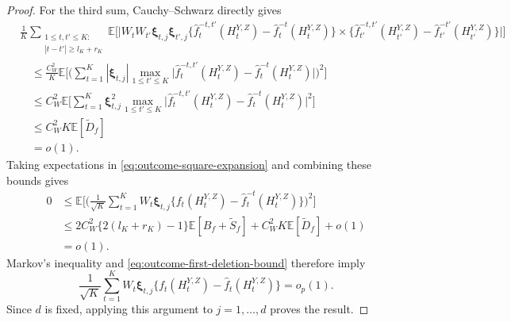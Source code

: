 \documentclass[10pt,a4paper]{amsart}
\def\E{\mathbb{E}}
\begin{document}
\begin{proof}
For the third sum, Cauchy--Schwarz directly gives
\begin{align*}
&\frac1K\sum_{\substack{1\leq t,t'\leq K:\\
|t-t'|\geq l_K+r_K}}
\E\Big[
\big|W_tW_{t'}\boldsymbol\xi_{t,j}\boldsymbol\xi_{t',j}
\big\{\hat f_t^{-t,t'}(H_t^{Y,Z})
-\hat f_t^{-t}(H_t^{Y,Z})\big\}\times
\big\{\hat f_{t'}^{-t,t'}(H_{t'}^{Y,Z})
-\hat f_{t'}^{-t'}(H_{t'}^{Y,Z})\big\}
\big|
\Big]\\
&\quad\leq\frac{C_W^2}{K}
\E\Big[
\Big(\sum_{t=1}^K|\boldsymbol\xi_{t,j}|
\max_{1\leq t'\leq K}
\big|\hat f_t^{-t,t'}(H_t^{Y,Z})
-\hat f_t^{-t}(H_t^{Y,Z})\big|\Big)^2
\Big]\\
&\quad\leq C_W^2
\E\Big[
\sum_{t=1}^K\boldsymbol\xi_{t,j}^2
\max_{1\leq t'\leq K}
\big|\hat f_t^{-t,t'}(H_t^{Y,Z})
-\hat f_t^{-t}(H_t^{Y,Z})\big|^2
\Big]\\
&\quad\leq C_W^2K\E[\tilde D_f]\\
&\quad=o(1).
\end{align*}
Taking expectations in \eqref{eq:outcome-square-expansion}
and combining these bounds gives
\begin{align*}
0
&\leq
\E\Bigg[
\Big(\frac1{\sqrt K}\sum_{t=1}^K
W_t\boldsymbol\xi_{t,j}
\big\{f_t(H_t^{Y,Z})-\hat f_t^{-t}(H_t^{Y,Z})\big\}
\Big)^2
\Bigg]\\
&\leq
2C_W^2\{2(l_K+r_K)-1\}\E[B_f+\tilde S_f]
+C_W^2K\E[\tilde D_f]+o(1)\\
&=o(1).
\end{align*}
Markov's inequality and \eqref{eq:outcome-first-deletion-bound}
therefore imply
\begin{equation}
\label{eq:termIII-converge}
\frac1{\sqrt K}\sum_{t=1}^K W_t\boldsymbol\xi_{t,j}
\big\{f_t(H_t^{Y,Z})-\hat f_t(H_t^{Y,Z})\big\}
=o_p(1).
\end{equation}
Since \(d\) is fixed, applying this argument to
\(j=1,\ldots,d\) proves the result.
\end{proof}
\end{document}
